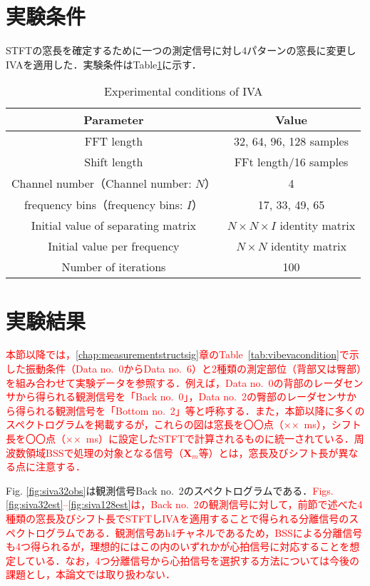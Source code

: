 {\section{実験条件}
\label{sec:conv:expcondition4}
STFTの窓長を確定するために一つの測定信号に対し4パターンの窓長に変更しIVAを適用した．実験条件はTable\ref{tab:iva}に示す．
\begin{table}[t]
  \caption{Experimental conditions of IVA}
  \centering
  \begin{tabular}{cc} \hline
    Parameter & Value \\ \hline \hline
    FFT length & 32, 64, 96, 128 samples  \\ \hline
    Shift length & FFt length/16 samples \\ \hline
    Channel number（Channel number: $N$） & 4 \\ \hline
    frequency bins（frequency bins: $I$） & 17, 33, 49, 65 \\ \hline
    Initial value of separating matrix & $N \times N \times I$ identity matrix  \\ \hline
    Initial value per frequency & $N \times N$ identity matrix  \\ \hline
    Number of iterations & 100\\ \hline
  \end{tabular}
  \label{tab:iva}
\end{table}

\section{実験結果}
\label{sec:conv:expresult4}

\textcolor{red}{本節以降では，\ref{chap:measurementstructsig}章のTable~\ref{tab:vibevacondition}で示した振動条件（Data no.~0からData no.~6）と2種類の測定部位（背部又は臀部）を組み合わせて実験データを参照する．例えば，Data no.~0の背部のレーダセンサから得られる観測信号を「Back no.~0」，Data no.~2の臀部のレーダセンサから得られる観測信号を「Bottom no.~2」等と呼称する．また，本節以降に多くのスペクトログラムを掲載するが，これらの図は窓長を〇〇点（××~ms），シフト長を〇〇点（××~ms）に設定したSTFTで計算されるものに統一されている．周波数領域BSSで処理の対象となる信号（$\bm{X}_m$等）とは，窓長及びシフト長が異なる点に注意する．}

Fig. \ref{fig:siva32obs}は観測信号Back no.~2のスペクトログラムである．\textcolor{red}{Figs. \ref{fig:siva32est}--\ref{fig:siva128est}は，Back no.~2の観測信号に対して，前節で述べた4種類の窓長及びシフト長でSTFTしIVAを適用することで得られる分離信号のスペクトログラムである．観測信号あh4チャネルであるため，BSSによる分離信号も4つ得られるが，理想的にはこの内のいずれかが心拍信号に対応することを想定している．なお，4つ分離信号から心拍信号を選択する方法については今後の課題とし，本論文では取り扱わない．}

}
